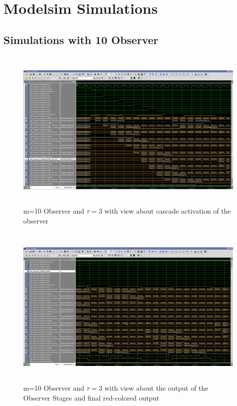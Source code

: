 
\chapter{Modelsim Simulations}
\label{appendix:2}
\section{Simulations with 10 Observer}
\begin{figure}[h]
\centering
\includegraphics[width=650px,height=300px,angle=-90]{../../pictures/Modelsim/10_Observer_tb_1.png}
\caption[Modelsim Simulation of 10 Observer - 1]{m=10 Observer and $\tau=3$ with view about cascade activation of the observer}
\label{fig:simulation:ten:first}
\end{figure}

\begin{figure}[h]
\centering
\includegraphics[width=650px,height=300px,angle=-90]{../../pictures/Modelsim/10_Observer_tb_2.png}
\caption[Modelsim Simulation of 10 Observer - 2]{m=10 Observer and $\tau=3$ with view about the output of the Observer Stages and final red-colored output}
\label{fig:simulation:ten:second}
\end{figure}

